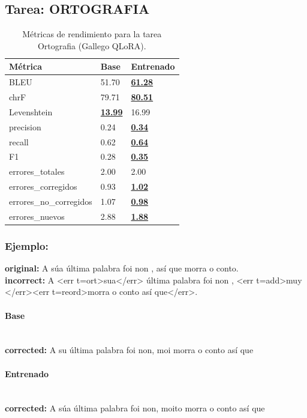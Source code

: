 \subsection{Tarea: ORTOGRAFIA}\label{tarea-ortografia}
\begin{longtable}[]{@{}lll@{}}
\toprule\noalign{}
Métrica & Base & Entrenado \\
\midrule\noalign{}
\endhead
\bottomrule\noalign{}
\caption{Métricas de rendimiento para la tarea Ortografia (Gallego QLoRA).}
\label{tab:metricas_ortografia_Gallego QLoRA}
\endlastfoot
BLEU & 51.70 & \textbf{\underline{61.28}} \\
chrF & 79.71 & \textbf{\underline{80.51}} \\
Levenshtein & \textbf{\underline{13.99}} & 16.99 \\
precision & 0.24 & \textbf{\underline{0.34}} \\
recall & 0.62 & \textbf{\underline{0.64}} \\
F1 & 0.28 & \textbf{\underline{0.35}} \\
errores\_totales & 2.00 & 2.00 \\
errores\_corregidos & 0.93 & \textbf{\underline{1.02}} \\
errores\_no\_corregidos & 1.07 & \textbf{\underline{0.98}} \\
errores\_nuevos & 2.88 & \textbf{\underline{1.88}} \\
\end{longtable}

\subsubsection{Ejemplo:}
\textbf{original:} A súa última palabra foi non , así que morra o conto.\\
\textbf{incorrect:} A {\textless}err t=ort{\textgreater}sua{\textless}/err{\textgreater} última palabra foi non , {\textless}err t=add{\textgreater}muy {\textless}/err{\textgreater}{\textless}err t=reord{\textgreater}morra o conto así que{\textless}/err{\textgreater}.

\paragraph{Base}~\\
\textbf{corrected:} A su última palabra foi non, moi morra o conto así que

\paragraph{Entrenado}~\\
\textbf{corrected:} A súa última palabra foi non, moito morra o conto así que